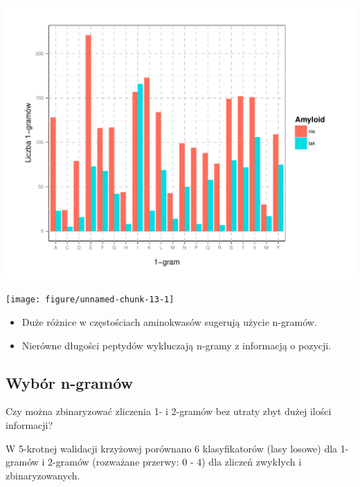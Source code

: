 \documentclass[10pt]{beamer}\usepackage[]{graphicx}\usepackage[]{color}
\makeatletter
\def\maxwidth{ %
  \ifdim\Gin@nat@width>\linewidth
    \linewidth
  \else
    \Gin@nat@width
  \fi
}
\makeatother
\begin{document}
\begin{frame}



\includegraphics[width=\maxwidth]{figure/unnamed-chunk-12-1} 


\end{frame}


\begin{frame}


\texttt{[image: figure/unnamed-chunk-13-1]} 


\end{frame}


\begin{frame}

\begin{itemize}
\item Duże różnice w częstościach aminokwasów sugerują użycie n-gramów.
\item Nierówne długości peptydów wykluczają n-gramy z informacją o pozycji.
\end{itemize}

\end{frame}



\subsection{Wybór n-gramów}


\begin{frame}

Czy można zbinaryzować zliczenia 1- i 2-gramów bez utraty zbyt dużej ilości informacji?

\vspace{2cm}

W 5-krotnej walidacji krzyżowej porównano 6 klasyfikatorów (lasy losowe) dla 1-gramów i 2-gramów (rozważane przerwy: 0 - 4) dla zliczeń zwykłych i zbinaryzowanych.

\end{frame}
\end{document}
